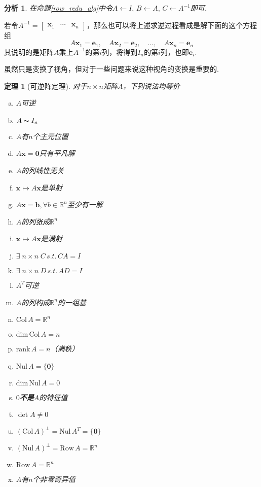 \documentclass[11pt,UTF8]{ctexart}
\newtheorem{theorem}{定理}
\newtheorem*{analysis}{分析}
\def\vx{\mathbf{x}}
\def\rn{\mathbb{R}^n}
\def\dim{\mathrm{dim}\,}
\def\rank{\mathrm{rank}\,}
\def\col{\mathrm{Col}\,}
\def\nul{\mathrm{Nul}\,}
\def\row{\mathrm{Row}\,}
\newcommand{\vb}[1]{\mathbf{#1}}
\newcommand{\bmat}[2]{\begin{bmatrix}{#1}&\cdots&{#2}\end{bmatrix}}
\begin{document}
\begin{analysis}
在命题\ref{row_redu_alg}中令$A\gets I,\,B\gets A,\,C\gets A^{-1}$即可.
\end{analysis}
若令$A^{-1}=\bmat{\vx_1}{\vx_n}$，那么也可以将上述求逆过程看成是解下面的这个方程组
\[A\vx_1=\vb{e}_1,\quad A\vx_2=\vb{e}_2,\quad\dots,\quad A\vx_n=\vb{e}_n\]
其说明的是矩阵$A$乘上$A^{-1}$的第$i$列，将得到$I_n$的第$i$列，也即$\vb{e}_i$.
\par 虽然只是变换了视角，但对于一些问题来说这种视角的变换是重要的.
\newpage
\begin{theorem}[可逆阵定理]
对于$n\times n$矩阵$A$，下列说法均等价
\begin{multicols}{2} %
\begin{enumerate}[(a)]
	\itemsep -3pt
	\item $A$可逆
	\item $A\thicksim I_n$
	\item $A$有$n$个主元位置
	\item $A\vx=\vb{0}$只有平凡解
	\item $A$的列线性无关
	\item $\vx\mapsto A\vx$是单射
	\item $A\vx=\vb{b},\forall b\in\mathbb{R}^n$至少有一解
	\item $A$的列张成$\mathbb{R}^n$
	\item $\vx\mapsto A\vx$是满射
	\item $\exists\;n\times n\;C\,s.t.\,CA=I$
	\item $\exists\;n\times n\;D\,s.t.\,AD=I$
	\item $A^T$可逆
	\item $A$的列构成$\rn$的一组基
	\item $\col A=\rn$
	\item $\dim\col A=n$
	\item $\rank A=n$（满秩）
	\item $\nul A=\{\vb{0}\}$
	\item $\dim\nul A=0$
	\item $0$\textbf{不是}$A$的特征值
	\item $\det A\ne 0$
	\item $(\col A)^\perp=\nul A^T=\{\vb{0}\}$
	\item $(\nul A)^\perp=\row A=\rn$
	\item $\row A=\rn$
	\item $A$有$n$个非零奇异值
\end{enumerate}
\end{multicols}
\end{theorem}
\end{document}
